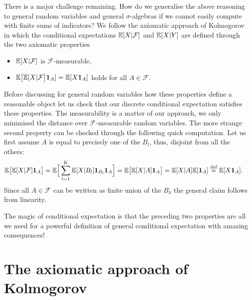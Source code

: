 There is a major challenge remaining. How do we generalise the above reasoning to general random variables and general $\sigma$-algebras if we cannot easily compute with finite sums of indicators? We follow the axiomatic approach of Kolmogorov in which the conditional expectations $\mathbb{E}[X|\mathcal F]$ and $\mathbb{E}[X|Y]$ are  defined through the two axiomatic properties
\begin{itemize}
	\item $\mathbb{E}[X|\mathcal F]$ is $\mathcal F$-measurable,
	\item $\mathbb{E}\big[\mathbb{E}[X|\mathcal F\big] \mathbf 1_A]=\mathbb{E}[X \mathbf 1_A]$ holds for all $A\in \mathcal F$.
\end{itemize}
Before discussing for general random variables how these properties define a reasonable object let us check that our discrete conditional expectation satisfies these properties. The measurability is a matter of our approach, we only minimised the distance over $\mathcal F$-measurable random variables. The more strange second property can be checked through the following quick computation. Let us first assume $A$ is equal to precisely one of the $B_l$, thus, disjoint from all the others:
\begin{align*}
	\mathbb{E}\big[ \mathbb{E}[X|\mathcal F] \mathbf 1_A\big]&=\mathbb{E}\Big[\sum_{l=1}^K \mathbb{E}[X|B_l]\mathbf 1_{B_l} \mathbf 1_A\Big]
	=\mathbb{E}\big[  \mathbb{E}[X|A] \mathbf 1_A\big]
	=\mathbb{E}[X|A] \mathbb{E}[\mathbf 1_A]
	\overset{\text{def}}{=} \mathbb{E}[X \mathbf 1_A].
\end{align*}
Since all $A\in \mathcal F$ can be written as finite union of the $B_k$ the general claim follows from linearity.\smallskip

The magic of conditional expectation is that the preceding two properties are all we need for a powerful definition of general conditional expectation with amazing consequences!


\section{The axiomatic approach of Kolmogorov}


